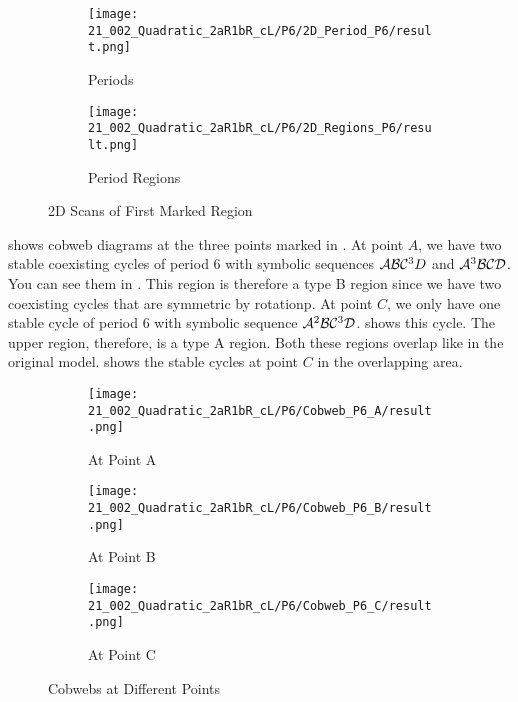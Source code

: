 \begin{figure}
    \centering
    \begin{subfigure}{0.4\textwidth}
        \centering
        \texttt{[image: 21\_002\_Quadratic\_2aR1bR\_cL/P6/2D\_Period\_P6/result.png]}
        \caption{Periods}
        \label{fig:quadratic.full.2aR1bR_cL.2d.1}
    \end{subfigure}
    \begin{subfigure}{0.4\textwidth}
        \centering
        \texttt{[image: 21\_002\_Quadratic\_2aR1bR\_cL/P6/2D\_Regions\_P6/result.png]}
        \caption{Period Regions}
        \label{fig:quadratic.regions.2aR1bR_cL.2d.1}
    \end{subfigure}
    \caption{2D Scans of First Marked Region}
\end{figure}

 shows cobweb diagrams at the three points marked in .
At point $A$, we have two stable coexisting cycles of period 6 with symbolic sequences $\mathcal{A}\mathcal{B}\mathcal{C}^3D$ and $\mathcal{A}^3\mathcal{B}\mathcal{C}\mathcal{D}$.
You can see them in .
This region is therefore a type B region since we have two coexisting cycles that are symmetric by rotationp.
At point $C$, we only have one stable cycle of period 6 with symbolic sequence $\mathcal{A}^2\mathcal{B}\mathcal{C}^3\mathcal{D}$.
 shows this cycle.
The upper region, therefore, is a type A region.
Both these regions overlap like in the original model.
 shows the stable cycles at point $C$ in the overlapping area.

\begin{figure}
    \centering
    \begin{subfigure}{0.3\textwidth}
        \centering
        \texttt{[image: 21\_002\_Quadratic\_2aR1bR\_cL/P6/Cobweb\_P6\_A/result.png]}
        \caption{At Point A}
        \label{fig:quad.full.2aR1bR_cL.CobwebA}
    \end{subfigure}
    \begin{subfigure}{0.3\textwidth}
        \centering
        \texttt{[image: 21\_002\_Quadratic\_2aR1bR\_cL/P6/Cobweb\_P6\_B/result.png]}
        \caption{At Point B}
        \label{fig:quad.full.2aR1bR_cL.CobwebB}
    \end{subfigure}
    \begin{subfigure}{0.3\textwidth}
        \centering
        \texttt{[image: 21\_002\_Quadratic\_2aR1bR\_cL/P6/Cobweb\_P6\_C/result.png]}
        \caption{At Point C}
        \label{fig:quad.full.2aR1bR_cL.CobwebC}
    \end{subfigure}
    \caption{Cobwebs at Different Points}
    \label{fig:quad.full.2aR1bR_cL.Cobwebs}
\end{figure}

